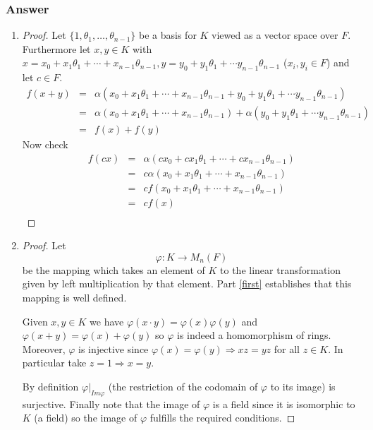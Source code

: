 \documentclass[10pt]{article}
\begin{document}
\subsubsection{Answer}
\begin{enumerate}
\item \label{first}
\begin{proof}
Let $\{ 1, \theta_1, \dots, \theta_{n-1}\}$ be a basis for $K$ viewed as a vector space over $F$. Furthermore let $x, y \in K$ with $x=x_0+x_1 \theta_1 +\cdots + x_{n-1}\theta_{n-1}, y=y_0+ y_1\theta_1 + \cdots y_{n-1} \theta_{n-1} $ ($x_i,y_i \in F$) and let $c \in F$.
\begin{eqnarray*}f(x+y)&=&\alpha (x_0+x_1 \theta_1 +\cdots + x_{n-1}\theta_{n-1}+y_0+ y_1\theta_1 + \cdots y_{n-1} \theta_{n-1})\\ 
&=&\alpha (x_0+x_1 \theta_1 +\cdots + x_{n-1}\theta_{n-1})+\alpha(y_0+ y_1\theta_1 + \cdots y_{n-1} \theta_{n-1})\\
&=&f(x)+f(y)
\end{eqnarray*}
Now check
\begin{eqnarray*}
f(c x) &=& \alpha  (cx_0+cx_1 \theta_1 +\cdots + cx_{n-1}\theta_{n-1})\\
&=& c \alpha (x_0+x_1 \theta_1 +\cdots + x_{n-1}\theta_{n-1})\\
&=& c f (x_0+x_1 \theta_1 +\cdots + x_{n-1}\theta_{n-1})\\
&=& c f (x)\\
\end{eqnarray*}\end{proof}
\item \begin{proof}Let
\[\varphi : K \to M_n(F)\]
be the mapping which takes an element of $K$ to the linear transformation given by left multiplication by that element. Part \ref{first} establishes that this mapping is well defined. 

Given $x, y \in K$ we have $\varphi(x \cdot y)=\varphi(x)\varphi(y)$ and  $\varphi(x+y) = \varphi(x) +\varphi(y)$
so $\varphi$ is indeed a homomorphism of rings. Moreover, $\varphi$ is injective since $\varphi(x)=\varphi(y) \Rightarrow x z = y z $ for all $z \in K$. In particular take $z =1 \Rightarrow x=y$.

By definition $\varphi|_{Im{\varphi}}$ (the restriction of the codomain of $\varphi$ to its image) is surjective. Finally note that the image of $\varphi$ is a field since it is isomorphic to $K$ (a field) so the image of $\varphi$ fulfills the required conditions.
\end{proof}
\end{enumerate}
\end{document}
